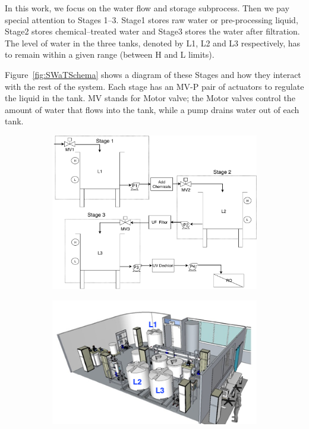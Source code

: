 {{{In this work, we focus on the water flow and storage subprocess. Then we pay special attention to Stages 1--3. Stage1 stores raw water or pre-processing liquid, Stage2 stores chemical--treated water and Stage3 stores the water after filtration.
The level of water in the three tanks, denoted by L1, L2 and L3 respectively, has to remain within a given range (between H and L limits).}

Figure~\ref{fig:SWaTSchema} shows a diagram of these Stages and how they interact with the rest of the system. 
Each stage has an MV-P pair of actuators to regulate the liquid in the tank. MV stands for Motor valve; the Motor valves control the amount of water that flows into the tank, while a pump drains water out of each tank.


\begin{figure}[htb]
  \centering
  \begin{subfigure}[b]{.65\linewidth}
  \includegraphics[width=\linewidth]{Figures/SWaT_allTanks-Stages}
  \end{subfigure}
  \begin{subfigure}[b]{.35\linewidth}
  \includegraphics[width=\linewidth]{Figures/testbed.png}

\end{subfigure}
\end{figure}}}

